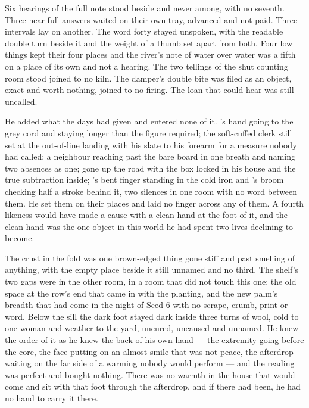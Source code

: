 Six hearings of the full note stood beside and never among, with no seventh. Three near-full answers waited on their own tray, advanced and not paid. Three intervals lay on another. The word forty stayed unspoken, with the readable double turn beside it and the weight of a thumb set apart from both. Four low things kept their four places and the river's note of water over water was a fifth on a place of its own and not a hearing. The two tellings of the shut counting room stood joined to no kiln. The damper's double bite was filed as an object, exact and worth nothing, joined to no firing. The loan that could hear was still uncalled.

He added what the days had given and entered none of it. 's hand going to the grey cord and staying longer than the figure required; the soft-cuffed clerk still set at the out-of-line landing with his slate to his forearm for a measure nobody had called; a neighbour reaching past the bare board in one breath and naming two absences as one;  gone up the road with the box locked in his house and the true subtraction inside; 's bent finger standing in the cold iron and 's broom checking half a stroke behind it, two silences in one room with no word between them. He set them on their places and laid no finger across any of them. A fourth likeness would have made a cause with a clean hand at the foot of it, and the clean hand was the one object in this world he had spent two lives declining to become.

The crust in the fold was one brown-edged thing gone stiff and past smelling of anything, with the empty place beside it still unnamed and no third. The shelf's two gaps were in the other room, in a room that did not touch this one: the old space at the row's end that came in with the planting, and the new palm's breadth that had come in the night of Seed 6 with no scrape, crumb, print or word. Below the sill the dark foot stayed dark inside three turns of wool, cold to one woman and weather to the yard, uncured, uncaused and unnamed. He knew the order of it as he knew the back of his own hand --- the extremity going before the core, the face putting on an almost-smile that was not peace, the afterdrop waiting on the far side of a warming nobody would perform --- and the reading was perfect and bought nothing. There was no warmth in the house that would come and sit with that foot through the afterdrop, and if there had been, he had no hand to carry it there.

